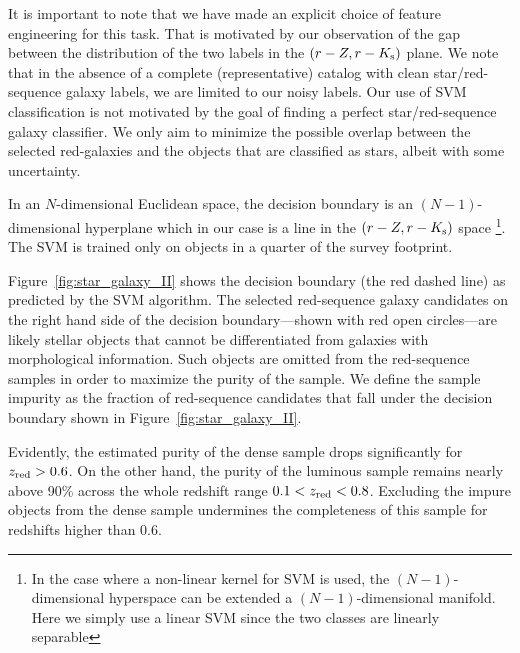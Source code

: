 \documentclass[fleqn,usenatbib,useAMS]{mnras}
\begin{document}
It is important to note that we have made an explicit choice of feature engineering for this task. That is motivated by our observation of the gap between the distribution of the two labels in the $(r-Z, r-K_{\rm s})$ plane. We note that in the absence of a complete (representative) catalog with clean star/red-sequence galaxy labels, we are limited to our noisy labels. Our use of SVM classification is not motivated by the goal of finding a perfect star/red-sequence galaxy classifier. We only aim to minimize the possible overlap between the selected red-galaxies and the objects that are classified as stars, albeit with some uncertainty. 

In an $N$-dimensional Euclidean space, the decision boundary is an $(N-1)$-dimensional hyperplane which in our case is a line in the $(r-Z, r-K_{\rm s})$ space \footnote{In the case where a non-linear kernel for SVM is used, the $(N-1)$-dimensional hyperspace can be extended a $(N-1)$-dimensional manifold. Here we simply use a linear SVM since the two classes are linearly separable}. The SVM is trained only on objects in a quarter of the survey footprint.

Figure~\ref{fig:star_galaxy_II} shows the decision boundary (the red dashed line) as predicted by the SVM algorithm. The selected red-sequence galaxy candidates on the right hand side of the decision boundary---shown with red open circles---are likely stellar objects that cannot be differentiated from galaxies with morphological information. Such objects are omitted from the red-sequence samples in order to maximize the purity of the sample. We define the sample impurity as the fraction of red-sequence candidates that fall under the decision boundary shown in Figure~\ref{fig:star_galaxy_II}. 

Evidently, the estimated purity of the dense sample drops significantly for $z_{\rm red}>0.6$. On the other hand, the purity of the luminous sample remains nearly above 90\% across the whole redshift range $0.1<z_{\rm red}<0.8$. Excluding the impure objects from the dense sample undermines the completeness of this sample for redshifts higher than 0.6. 
\end{document}

